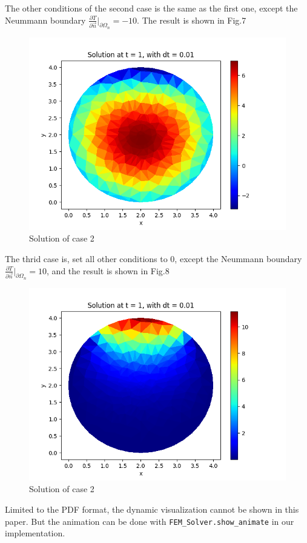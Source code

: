 \documentclass[conference]{IEEEtran}
\begin{document}
    The other conditions of the second case is the same as the first one, except the Neummann boundary 
    $\frac{\partial{T}}{\partial{\vec{n}}}\big |_{\partial{\Omega_n}} = -10$. The result is shown in Fig.7
    \begin{figure}[H]
        \centering
        \includegraphics[scale=0.4]{../fig/ext_10_neum_-10.png}
        \caption{Solution of case 2}
    \end{figure}
    The thrid case is, set all other conditions to 0, except the Neummann boundary $\frac{\partial{T}}{\partial{\vec{n}}}\big |_{\partial{\Omega_n}} = 10$,
    and the result is shown in Fig.8
    \begin{figure}[H]
        \centering
        \includegraphics[scale=0.4]{../fig/no_ext_neum_10.png}
        \caption{Solution of case 2}
    \end{figure}
    Limited to the PDF format, the dynamic visualization cannot be shown in this paper. But the animation can be 
    done with \texttt{FEM\_Solver.show\_animate} in our implementation.
\end{document}
